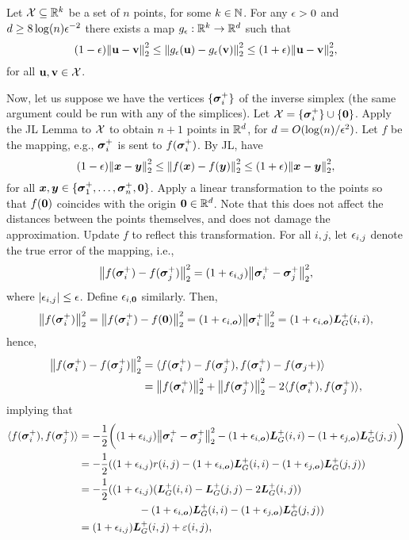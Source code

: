 \begin{theorem}
	Let $\mathcal{X}\subseteq \mathbb{R}^k$ be a set of $n$ points, for some $k\in\mathbb{N}$. For any $\epsilon>0$ and $d\geq 8\log(n)\epsilon^{-2}$ there exists a map $g_\epsilon:\mathbb{R}^k\to\mathbb{R}^d$ such that 
	\begin{equation*}
	(1-\epsilon)\norm{\vb{u}-\vb{v}}_2^2 \leq \norm{g_\epsilon(\vb{u}) - g_\epsilon(\vb{v})}_2^2 \leq (1+\epsilon)\norm{\vb{u}-\vb{v}}_2^2,
	\end{equation*}
	for all $\vb{u},\vb{v}\in \mathcal{X}$. 
\end{theorem}



Now, let us suppose we have the vertices $\{\vb*{\sigma}_i^+\}$ of the inverse simplex (the same argument could be run  with any of the simplices). Let $\mathcal{X} = \{\vb*{\sigma}_i^+\}\cup\{\vb{0}\}$. Apply the JL Lemma to $\mathcal{X}$ to  obtain $n+1$ points in $\mathbb{R}^d$, for $d=O(\log(n)/\epsilon^2)$. Let $f$ be the mapping, e.g., $\vb*{\sigma}_i^+$ is sent to $f(\vb*{\sigma}_i^+)$. By JL, have 
\[(1-\epsilon)\norm{\vb*{x}-\vb*{y}}_2^2\leq  \norm{f(\vb*{x}) -f(\vb*{y})}_2^2\leq (1+\epsilon)\norm{\vb*{x}-\vb*{y}}_2^2, \]
for all $\vb*{x},\vb*{y}\in \{\vb*{\sigma}_1^+,\dots,\vb*{\sigma}_n^+,\vb{0}\}$. 
Apply a linear transformation to the points so that $f(\vb{0})$ coincides with the origin $\vb{0}\in\mathbb{R}^d$. Note that this does not affect the distances between the points themselves, and does not damage the approximation. Update $f$ to reflect this transformation. 
For all $i,j$, let $\epsilon_{i,j}$ denote the true error of the mapping, i.e., 
\[\norm{f(\vb*{\sigma}_i^+)-f(\vb*{\sigma}_j^+)}_2^2 = (1+\epsilon_{i,j})\norm{\vb*{\sigma}_i^+-\vb*{\sigma}_j^+}_2^2,\]
where $|\epsilon_{i,j}|\leq \epsilon$. Define $\epsilon_{i,\vb{0}}$ similarly. 
Then, 
\[\norm{f(\vb*{\sigma}_i^+)}_2^2 = \norm{f(\vb*{\sigma}_i^+)-f(\vb{0})}_2^2 = (1+\epsilon_{i,\vb*{o}})\norm{\vb*{\sigma}_i^+}_2^2 = (1+\epsilon_{i,\vb*{o}})\vb*{L}_G^+(i,i),\]
hence, 
\begin{align*}
\norm{f(\vb*{\sigma}_i^+)-f(\vb*{\sigma}_j^+)}_2^2 &= \langle f(\vb*{\sigma}_i^+)-f(\vb*{\sigma}_j^+),f(\vb*{\sigma}_i^+)-f(\vb*{\sigma}_j+)\rangle \\
&= \norm{f(\vb*{\sigma}_i^+)}_2^2 + \norm{f(\vb*{\sigma}_j^+)}_2^2 - 2\langle f(\vb*{\sigma}_i^+),f(\vb*{\sigma}_j^+)\rangle,  
\end{align*}
implying that 
\begin{align*}
\langle f(\vb*{\sigma}_i^+),f(\vb*{\sigma}_j^+) \rangle &= -\frac{1}{2} \bigg((1+\epsilon_{i,j})\norm{\vb*{\sigma}_i^+-\vb*{\sigma}_j^+}_2^2 - (1+\epsilon_{i,\vb*{o}})\vb*{L}_G^+(i,i) - (1+\epsilon_{j,\vb*{o}})\vb*{L}_G^+(j,j)\bigg) \\
&= -\frac{1}{2}((1+\epsilon_{i,j})r(i,j) - (1+\epsilon_{i,\vb*{o}})\vb*{L}_G^+(i,i) - (1+\epsilon_{j,\vb*{o}})\vb*{L}_G^+(j,j)) \\
&= -\frac{1}{2}((1+\epsilon_{i,j})(\vb*{L}_G^+(i,i) - \vb*{L}_G^+(j,j) - 2\vb*{L}_G^+(i,j)) \\
&\hspace{2cm}- (1+\epsilon_{i,\vb*{o}})\vb*{L}_G^+(i,i) - (1+\epsilon_{j,\vb*{o}})\vb*{L}_G^+(j,j))\\
&= (1+\epsilon_{i,j})\vb*{L}_G^+(i,j) + \varepsilon(i,j),
\end{align*}

